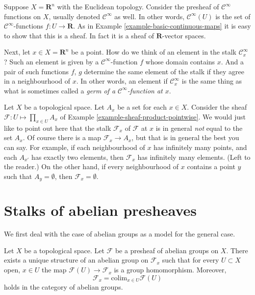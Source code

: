 \begin{example}
\label{example-germs-functions}
Suppose $X = \mathbf{R}^n$ with the Euclidean topology.
Consider the presheaf of $\mathcal{C}^\infty$ functions
on $X$, usually denoted $\mathcal{C}^\infty$ as well.
In other words, $\mathcal{C}^\infty(U)$ is the set
of $\mathcal{C}^\infty$-functions $f : U \to \mathbf{R}$.
As in Example \ref{example-basic-continuous-maps}
it is easy to show that this is a sheaf. In fact it
is a sheaf of $\mathbf{R}$-vector spaces.

\medskip\noindent
Next, let $x \in X = \mathbf{R}^n$ be a point. How do
we think of an element in the stalk $\mathcal{C}^\infty_x$?
Such an element is given by a $\mathcal{C}^\infty$-function 
$f$ whose domain contains $x$. And a pair of such
functions $f$, $g$ determine
the same element of the stalk if they agree in a neighbourhood
of $x$. In other words, an element if $\mathcal{C}^\infty_x$
is the same thing as what is sometimes called
a {\it germ of a $\mathcal{C}^\infty$-function at $x$}.
\end{example}

\begin{example}
\label{example-sheaf-product-pointwise-stalk}
Let $X$ be a topological space. Let $A_x$ be a set for each $x \in X$.
Consider the sheaf $\mathcal{F} : U \mapsto \prod_{x\in U} A_x$ of Example
\ref{example-sheaf-product-pointwise}. We would just like to point
out here that the stalk $\mathcal{F}_x$ of $\mathcal{F}$ at $x$
is in general {\it not} equal to the set $A_x$. Of course there is
a map $\mathcal{F}_x \to A_x$, but that is in general the best you
can say. For example, if each neighbourhood of $x$
has infinitely many points, and each $A_{x'}$ has exactly two elements,
then $\mathcal{F}_x$ has infinitely many elements. (Left to the
reader.) On the other hand, if every neighbourhood of $x$ contains
a point $y$ such that $A_y = \emptyset$, then $\mathcal{F}_x = \emptyset$.
\end{example}



\section{Stalks of abelian presheaves}
\label{section-stalks-abelian-presheaves}

\noindent
We first deal with the case of abelian groups as
a model for the general case.

\begin{lemma}
\label{lemma-stalk-abelian-presheaf}
Let $X$ be a topological space. Let $\mathcal{F}$ be a presheaf
of abelian groups on $X$. There exists a unique structure of an
abelian group on $\mathcal{F}_x$ such that for every
$U \subset X$ open, $x\in U$ the map $\mathcal{F}(U) \to \mathcal{F}_x$
is a group homomorphism. Moreover, 
$$
\mathcal{F}_x
=
\text{colim}_{x\in U} \mathcal{F}(U)
$$
holds in the category of abelian groups.
\end{lemma}

